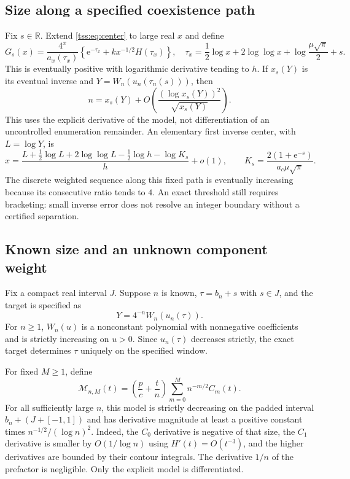 \documentclass[11pt]{article}
\theoremstyle{remark}\newtheorem{remark}[theorem]{Remark}
\theoremstyle{definition}\newtheorem{definition}[theorem]{Definition}
\newcommand{\e}{\mathrm e}
\newcommand{\RR}{\mathbb R}
\begin{document}
\subsection{Size along a specified coexistence path}
Fix $s\in\RR$. Extend \eqref{tss:eq:center} to large real $x$ and define
\begin{equation}\label{tss:eq:pathmodel}
G_s(x)=\frac{4^x}{a_x(\tau_x)}
  \left\{\e^{-\tau_x}+kx^{-1/2}H(\tau_x)\right\},
\quad \tau_x=\frac12\log x+2\log\log x+\log\frac{\mu\sqrt\pi}{2}+s.
\end{equation}
This is eventually positive with logarithmic derivative tending to $h$. If $x_s(Y)$ is its eventual inverse and
$Y=W_n(u_n(\tau_n(s)))$, then
\begin{equation}\label{tss:eq:pathinverse}
n=x_s(Y)+O\left(\frac{(\log x_s(Y))^2}{\sqrt{x_s(Y)}}\right).
\end{equation}
This uses the explicit derivative of the model, not differentiation of an uncontrolled enumeration remainder. An elementary first inverse center, with $L=\log Y$, is
\begin{equation}\label{tss:eq:inversecenter}
x=\frac{L+\frac12\log L+2\log\log L-\frac12\log h-\log K_s}{h}+o(1),
\qquad K_s=\frac{2(1+\e^{-s})}{a_c\mu\sqrt\pi}.
\end{equation}
The discrete weighted sequence along this fixed path is eventually increasing because its consecutive ratio tends to $4$. An exact threshold still requires bracketing: small inverse error does not resolve an integer boundary without a certified separation.

\subsection{Known size and an unknown component weight}
Fix a compact real interval $J$. Suppose $n$ is known, $\tau=b_n+s$ with $s\in J$, and the target is specified as
\begin{equation}\label{tss:eq:target}
Y=4^{-n}W_n(u_n(\tau)).
\end{equation}
For $n\geq1$, $W_n(u)$ is a nonconstant polynomial with nonnegative coefficients and is strictly increasing on $u>0$. Since $u_n(\tau)$ decreases strictly, the exact target determines $\tau$ uniquely on the specified window.

For fixed $M\geq1$, define
\begin{equation}\label{tss:eq:weightmodel}
\mathcal M_{n,M}(t)=\left(\frac pc+\frac tn\right)
          \sum_{m=0}^M n^{-m/2}C_m(t).
\end{equation}
For all sufficiently large $n$, this model is strictly decreasing on the padded interval $b_n+(J+[-1,1])$ and has derivative magnitude at least a positive constant times $n^{-1/2}/(\log n)^2$. Indeed, the $C_0$ derivative is negative of that size, the $C_1$ derivative is smaller by $O(1/\log n)$ using $H'(t)=O(t^{-3})$, and the higher derivatives are bounded by their contour integrals. The derivative $1/n$ of the prefactor is negligible. Only the explicit model is differentiated.
\end{document}
